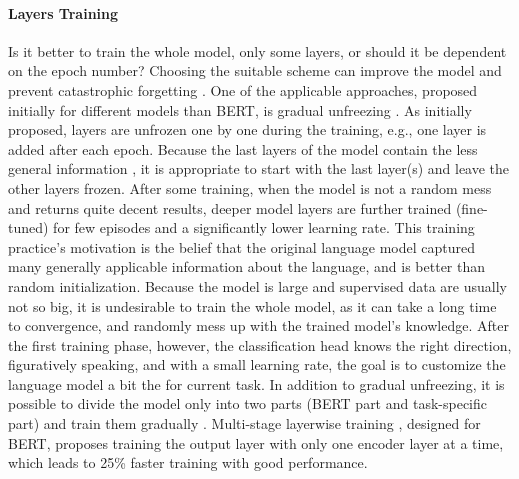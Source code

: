 \paragraph{Layers Training} Is it better to train the whole model, only some layers, or should it be dependent on the epoch number? Choosing the suitable scheme can improve the model and prevent catastrophic forgetting \citep{Liu2020}. One of the applicable approaches, proposed initially for different models than BERT, is gradual unfreezing \citep{Ruder2018, Chronopoulou2019}. As initially proposed, layers are unfrozen one by one during the training, e.g., one layer is added after each epoch. Because the last layers of the model contain the less general information \citep{Ruder2018, Yosinski2014}, it is appropriate to start with the last layer(s) and leave the other layers frozen. After some training, when the model is not a random mess and returns quite decent results, deeper model layers are further trained (fine-tuned) for few episodes and a significantly lower learning rate. This training practice's motivation is the belief that the original language model captured many generally applicable information about the language, and is better than random initialization. Because the model is large and supervised data are usually not so big, it is undesirable to train the whole model, as it can take a long time to convergence, and randomly mess up with the trained model's knowledge. After the first training phase, however, the classification head knows the right direction, figuratively speaking, and with a small learning rate, the goal is to customize the language model a bit the for current task. In addition to gradual unfreezing, it is possible to divide the model only into two parts (BERT part and task-specific part) and train them gradually \citep{Kondratyuk2019}. Multi-stage layerwise training \citep{Yang2020}, designed for BERT, proposes training the output layer with only one encoder layer at a time, which leads to 25\% faster training with good performance.
